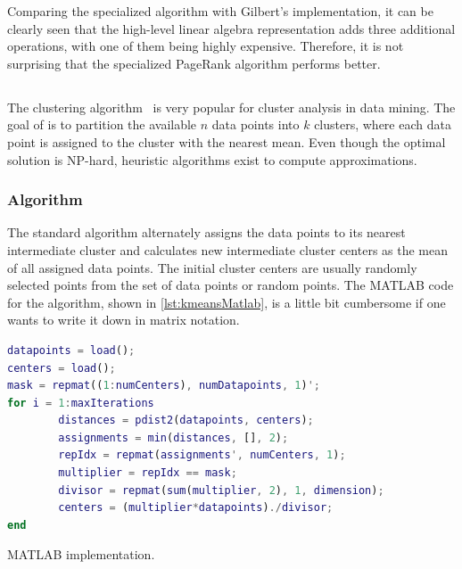 Comparing the specialized algorithm with Gilbert's implementation, it can be clearly seen that the high-level linear algebra representation adds three additional operations, with one of them being highly expensive.
Therefore, it is not surprising that the specialized PageRank algorithm performs better.

\subsection{\kmeans}

The \kmeans clustering algorithm~\cite{macqueen:1967a} is very popular for cluster analysis in data mining.
The goal of \kmeans is to partition the available $n$ data points into $k$ clusters, where each data point is assigned to the cluster with the nearest mean.
Even though the optimal solution is NP-hard, heuristic algorithms exist to compute approximations.

\subsubsection{Algorithm}

The standard algorithm alternately assigns the data points to its nearest intermediate cluster and calculates new intermediate cluster centers as the mean of all assigned data points.
The initial cluster centers are usually randomly selected points from the set of data points or random points.
The MATLAB code for the \kmeans algorithm, shown in \cref{lst:kmeansMatlab}, is a little bit cumbersome if one wants to write it down in matrix notation.

\begin{listing}
	\begin{CenteredBox}
		\begin{lstlisting}[language=Matlab,
		commentstyle=\color{black},
		  stringstyle=\color{black},
		  keywordstyle=\color{black}\bfseries,
		  morekeywords={pdist2, repmat, },]
datapoints = load();
centers = load();
mask = repmat((1:numCenters), numDatapoints, 1)';
for i = 1:maxIterations
		distances = pdist2(datapoints, centers);
		assignments = min(distances, [], 2);
		repIdx = repmat(assignments', numCenters, 1);
		multiplier = repIdx == mask;
		divisor = repmat(sum(multiplier, 2), 1, dimension);
		centers = (multiplier*datapoints)./divisor;
end
		\end{lstlisting}
	\end{CenteredBox}
	\caption{MATLAB \kmeans implementation.}
	\label{lst:kmeansMatlab}
\end{listing}

